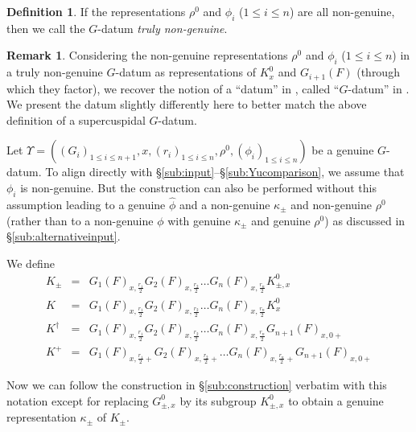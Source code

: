 \documentclass{article}
\def\hat{\widehat}
\theoremstyle{definition}
\newtheorem{rem}[thm]{Remark}
\newtheorem{dfn}[thm]{Definition}
\numberwithin{equation}{subsection}
\renewcommand{\-}{\hyp{}}
\begin{document}
\begin{dfn}
	If the representations $\rho^0$ and $\phi_i$ ($1 \leq i \leq n$) are all non-genuine, then we call the $G$-datum \emph{truly non-genuine}.  
	\end{dfn}

\begin{rem}
	Considering the non-genuine representations $\rho^0$ and $\phi_i$ ($1 \leq i \leq n$) in a truly non-genuine $G$-datum as representations of $K^0_x$ and $G_{i+1}(F)$ (through which they factor), we recover the notion of a ``datum'' in \cite[\S7.2]{KimYu}, called ``$G$-datum'' in \cite[\S4.1]{AFMO2}. We present the datum slightly differently here to better match the above definition of a supercuspidal $G$-datum. 
\end{rem}


Let \(\Upsilon= ((G_i)_{1\leq i\leq n+1},x,(r_i)_{1\leq i\leq n},\rho^0,(\phi_i)_{1\leq i\leq n}) \) be a genuine $G$-datum. To align directly with \S\ref{sub:input}--\S\ref{sub:Yucomparison}, we assume that $\phi_i$ is non-genuine. But the construction can also be performed without this assumption leading to a genuine $\hat \phi$ and a non-genuine $\kappa_{\pm}$ and non-genuine $\rho^0$ (rather than to a non-genuine $\phi$ with genuine $\kappa_{\pm}$ and genuine $\rho^0$) as discussed in \S\ref{sub:alternativeinput}.

We define 
\begin{eqnarray*}
	K_{\pm} & =& G_1(F)_{x,\frac{r_1}{2}}G_2(F)_{x,\frac{r_2}{2}}\hdots G_n(F)_{x,\frac{r_n}{2}}K^0_{\pm,x}  \\
	K & =& G_1(F)_{x,\frac{r_1}{2}}G_2(F)_{x,\frac{r_2}{2}}\hdots G_n(F)_{x,\frac{r_n}{2}}K^0_{x} \\
	K^\dagger & =& G_1(F)_{x,\frac{r_1}{2}}G_2(F)_{x,\frac{r_2}{2}}\hdots G_n(F)_{x,\frac{r_n}{2}}G_{n+1}(F)_{x,0+}\\
	K^+ & =& G_1(F)_{x,\frac{r_1}{2}+}G_2(F)_{x,\frac{r_2}{2}+}\hdots G_n(F)_{x,\frac{r_n}{2}+}G_{n+1}(F)_{x,0+} 
\end{eqnarray*}

Now we can follow the construction in \S\ref{sub:construction} verbatim with this notation except for replacing $G^0_{\pm, x}$ by its subgroup $K^0_{\pm, x}$ to obtain a genuine representation $\kappa_{\pm}$ of $K_{\pm}$. 
\end{document}
